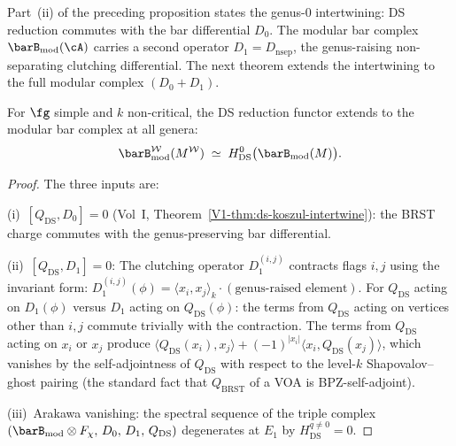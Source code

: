 Part~(ii) of the preceding proposition states the genus-$0$
intertwining: DS reduction commutes with the bar differential $D_0$.
The modular bar complex $\barB_{\mathrm{mod}}(\cA)$ carries a second operator
$D_1 = D_{\mathrm{nsep}}$, the genus-raising non-separating clutching
differential. The next theorem extends the intertwining to the full
modular complex $(D_0 + D_1)$.

\begin{theorem}
\label{thm:ds-modular-intertwining}
For $\fg$ simple and $k$ non-critical, the DS reduction functor
extends to the modular bar complex at all genera:
\[
\barB_{\mathrm{mod}}^{\mathcal{W}}(M^{\mathcal{W}})
\;\simeq\;
H^0_{\mathrm{DS}}\bigl(\barB_{\mathrm{mod}}(M)\bigr).
\]
\end{theorem}

\begin{proof}
The three inputs are:

\textup{(i)}~$[Q_{\mathrm{DS}}, D_0] = 0$
\textup{(}Vol~I, Theorem~\textup{\ref{V1-thm:ds-koszul-intertwine}):}
the BRST charge commutes with the genus-preserving bar differential.

\textup{(ii)}~$[Q_{\mathrm{DS}}, D_1] = 0$: The clutching operator
$D_1^{(i,j)}$ contracts flags $i,j$ using the invariant form:
$D_1^{(i,j)}(\phi) = \langle x_i, x_j \rangle_k \cdot
(\text{genus-raised element})$. For $Q_{\mathrm{DS}}$ acting on
$D_1(\phi)$ versus $D_1$ acting on $Q_{\mathrm{DS}}(\phi)$: the
terms from $Q_{\mathrm{DS}}$ acting on vertices other than $i,j$
commute trivially with the contraction. The terms from
$Q_{\mathrm{DS}}$ acting on $x_i$ or $x_j$ produce
$\langle Q_{\mathrm{DS}}(x_i), x_j \rangle +
(-1)^{|x_i|} \langle x_i, Q_{\mathrm{DS}}(x_j) \rangle$, which
vanishes by the self-adjointness of $Q_{\mathrm{DS}}$ with respect
to the level-$k$ Shapovalov--ghost pairing (the standard fact that
$Q_{\mathrm{BRST}}$ of a VOA is BPZ-self-adjoint).

\textup{(iii)}~Arakawa vanishing: the spectral sequence of the
triple complex $(\barB_{\mathrm{mod}} \otimes F_\chi,\, D_0,\, D_1,\,
Q_{\mathrm{DS}})$ degenerates at $E_1$ by $H^{q \ne 0}_{\mathrm{DS}} = 0$.
\end{proof}

